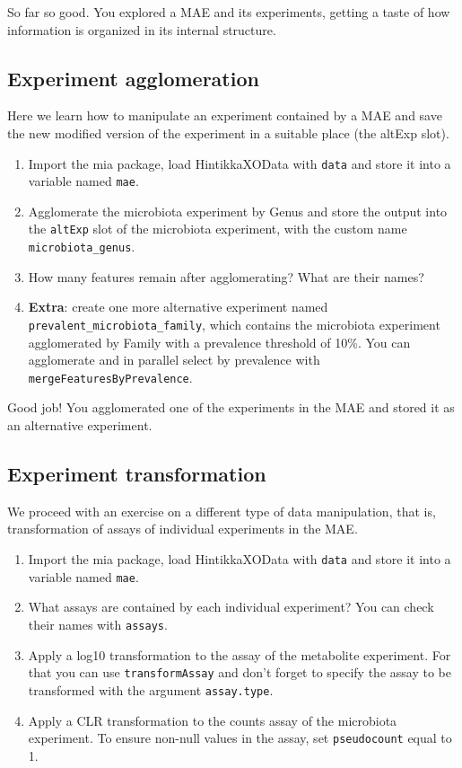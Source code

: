 \documentclass[
]{book}
\providecommand{\tightlist}{%
  \setlength{\itemsep}{0pt}\setlength{\parskip}{0pt}}
\begin{document}
So far so good. You explored a MAE and its experiments, getting a taste of how
information is organized in its internal structure.

\hypertarget{experiment-agglomeration}{%
\subsection{Experiment agglomeration}\label{experiment-agglomeration}}

Here we learn how to manipulate an experiment contained by a MAE and save the
new modified version of the experiment in a suitable place (the altExp slot).

\begin{enumerate}
\def\labelenumi{\arabic{enumi}.}
\tightlist
\item
  Import the mia package, load HintikkaXOData with \texttt{data} and store it into a
  variable named \texttt{mae}.
\item
  Agglomerate the microbiota experiment by Genus and store the output into the
  \texttt{altExp} slot of the microbiota experiment, with the custom name
  \texttt{microbiota\_genus}.
\item
  How many features remain after agglomerating? What are their names?
\item
  \textbf{Extra}: create one more alternative experiment named
  \texttt{prevalent\_microbiota\_family}, which contains the microbiota experiment
  agglomerated by Family with a prevalence threshold of 10\%. You can
  agglomerate and in parallel select by prevalence with
  \texttt{mergeFeaturesByPrevalence}.
\end{enumerate}

Good job! You agglomerated one of the experiments in the MAE and stored it as
an alternative experiment.

\hypertarget{experiment-transformation}{%
\subsection{Experiment transformation}\label{experiment-transformation}}

We proceed with an exercise on a different type of data manipulation, that is,
transformation of assays of individual experiments in the MAE.

\begin{enumerate}
\def\labelenumi{\arabic{enumi}.}
\tightlist
\item
  Import the mia package, load HintikkaXOData with \texttt{data} and store it into a
  variable named \texttt{mae}.
\item
  What assays are contained by each individual experiment? You can check their
  names with \texttt{assays}.
\item
  Apply a log10 transformation to the assay of the metabolite experiment.
  For that you can use \texttt{transformAssay} and don't forget to specify the assay
  to be transformed with the argument \texttt{assay.type}.
\item
  Apply a CLR transformation to the counts assay of the microbiota experiment.
  To ensure non-null values in the assay, set \texttt{pseudocount} equal to 1.
\end{enumerate}
\end{document}
